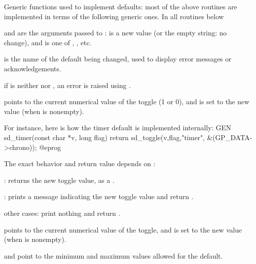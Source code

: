 

\noindent Generic functions used to implement defaults: most of the above
routines are implemented in terms of the following generic ones. In all
routines below

\item {} and  are the arguments passed to :
 is a new value (or the empty string: no change), and  is one
of , , etc.

\item {} is the name of the default being changed, used to display error
messages or acknowledgements.


\item if  is neither  nor , an error is raised using
.

\item {} points to the current numerical value of the toggle (1 or 0),
and is set to the new value (when  is nonempty).

For instance, here is how the timer default is implemented internally:
\bprog
GEN
sd_timer(const char *v, long flag)
{ return sd_toggle(v,flag,"timer", &(GP_DATA->chrono)); }
@eprog

The exact behavior and return value depends on :

\item {}: returns the new toggle value, as a .

\item {}: prints a message indicating the new toggle value
and return .

\item other cases: print nothing and return .



\item {} points to the current numerical value of the toggle, and is set
to the new value (when  is nonempty).

\item {} and  point to the minimum and maximum values allowed
for the default.

